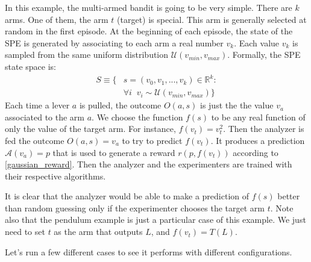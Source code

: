 \documentclass[11pt,a4paper,twoside]{report}
\newcommand{\+}{\textnormal{+} }
\theoremstyle{definition}
\numberwithin{equation}{chapter}
\begin{document}
  In this example, the multi-armed bandit is going to be very simple. There are
  $k$ arms. One of them, the arm $t$ (target) is special. This arm is generally
  selected at random in the first episode. At the beginning of each episode, the
  state of the SPE is generated by associating to each arm a real number $v_k$.
  Each value $v_k$ is sampled from the same uniform distribution
  $\mathcal{U}(v_{min},v_{max})$. Formally, the SPE state space is:
  \begin{align}
    S\equiv\{&s=(v_0, v_1,...,v_k) \in \mathbb{R}^k: \\
    & \forall i \; \; v_i \sim \mathcal{U}(v_{min},v_{max})
    \}
  \end{align}
  Each time a lever $a$ is pulled, the outcome $O(a,s)$ is just the the value
  $v_a$ associated to the arm $a$. We choose the function $f(s)$ to be any real
  function of only the value of the target arm. For instance, $f(v_t)=v_t^2$.
  Then the analyzer is fed the outcome $O(a,s)=v_a$ to try to predict $f(v_t)$.
  It produces a prediction $\mathscr{A}(v_a)=p$ that is used to generate a reward
  $r(p,f(v_t))$ according to \eqref{gaussian_reward}. Then the analyzer and the
  experimenters are trained with their respective algorithms.

  \par It is clear that the analyzer would be able to make a prediction of
  $f(s)$ better than random guessing only if the experimenter chooses the target
  arm $t$. Note also that the pendulum example is just a particular case of this
  example. We just need to set $t$ as the arm that outputs $L$, and
  $f(v_t)=T(L)$.

  Let's run a few different cases to see it performs with different
  configurations.
\end{document}
